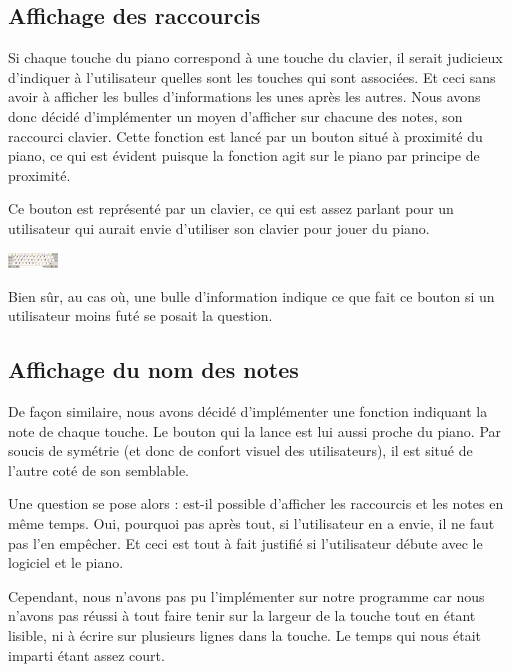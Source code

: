 \documentclass{article}
\begin{document}
\subsection{Affichage des raccourcis}
Si chaque touche du piano correspond à une touche du clavier, il serait judicieux d'indiquer à l'utilisateur quelles sont les touches
qui sont associées. Et ceci sans avoir à afficher les bulles d'informations les unes après les autres. Nous avons donc décidé d'implémenter
un moyen d'afficher sur chacune des notes, son raccourci clavier. Cette fonction est lancé par un bouton situé à proximité du piano, ce qui
est évident puisque la fonction agit sur le piano par principe de proximité.


Ce bouton est représenté par un clavier, ce qui est assez parlant pour un utilisateur qui aurait envie d'utiliser son clavier 
pour jouer du piano.
\begin{center}
\includegraphics[width = 50px]{./images/clavier.png}
\end{center}


Bien sûr, au cas où, une bulle d'information indique ce que fait ce bouton si un utilisateur moins futé se posait la question.

\subsection{Affichage du nom des notes}
De façon similaire, nous avons décidé d'implémenter une fonction indiquant la note de chaque touche. Le bouton qui la lance est lui 
aussi proche du piano. Par soucis de symétrie (et donc de confort visuel des utilisateurs), il est situé de l'autre coté de son semblable.

Une question se pose alors : est-il possible d'afficher les raccourcis et les notes en même temps.
Oui, pourquoi pas après tout, si l'utilisateur en a envie, il ne faut pas l'en empêcher. Et ceci est tout à fait justifié si 
l'utilisateur débute avec le logiciel et le piano.


Cependant, nous n'avons pas pu l'implémenter sur notre programme car nous n'avons pas réussi à tout faire tenir sur la largeur de la touche
tout en étant lisible, ni à écrire sur plusieurs lignes dans la touche. Le temps qui nous était imparti étant assez court.
\end{document}
